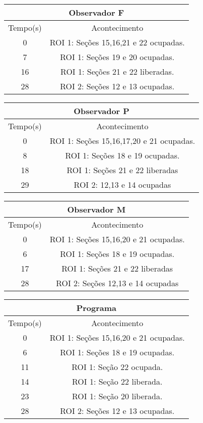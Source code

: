 \begin{center}
\begin{tabular}{|c||c|}
\hline
\multicolumn{2}{|c|}{Observador F}  \\ \hline \hline
Tempo(s) & Acontecimento \\ \hline
0 & ROI 1: Seções 15,16,21 e 22 ocupadas. \\ \hline
7 & ROI 1: Seções 19 e 20 ocupadas. \\ \hline
16 & ROI 1: Seções 21 e 22 liberadas. \\ \hline
28 & ROI 2: Seções 12 e 13 ocupadas. \\
\hline
\end{tabular}
\end{center}

\begin{center}
\begin{tabular}{|c||c|}
\hline
\multicolumn{2}{|c|}{Observador P}  \\ \hline \hline
Tempo(s) & Acontecimento \\ \hline
0 & ROI 1: Seções 15,16,17,20 e 21 ocupadas. \\ \hline
8 & ROI 1: Seções 18 e 19 ocupadas. \\ \hline
18 & ROI 1: Seções 21 e 22 liberadas \\ \hline
29 & ROI 2: 12,13 e 14 ocupadas \\
\hline
\end{tabular}
\end{center}

\begin{center}
\begin{tabular}{|c||c|}
\hline
\multicolumn{2}{|c|}{Observador M}  \\ \hline \hline
Tempo(s) & Acontecimento \\ \hline
0 & ROI 1: Seções 15,16,20 e 21 ocupadas. \\ \hline
6 & ROI 1: Seções 18 e 19 ocupadas. \\ \hline
17 & ROI 1: Seções 21 e 22 liberadas \\ \hline
28 & ROI 2: Seções 12,13 e 14 ocupadas \\
\hline
\end{tabular}
\end{center}

\begin{center}
\begin{tabular}{|c||c|}
\hline
\multicolumn{2}{|c|}{Programa}  \\ \hline \hline
Tempo(s) & Acontecimento \\ \hline
0 & ROI 1: Seções 15,16,20 e 21 ocupadas. \\ \hline
6 & ROI 1: Seções 18 e 19 ocupadas. \\ \hline
11 & ROI 1: Seção 22 ocupada. \\ \hline
14 & ROI 1: Seção 22 liberada. \\ \hline
23 & ROI 1: Seção 20 liberada. \\ \hline
28 & ROI 2: Seções 12 e 13 ocupadas. \\
\hline
\end{tabular}
\end{center}

